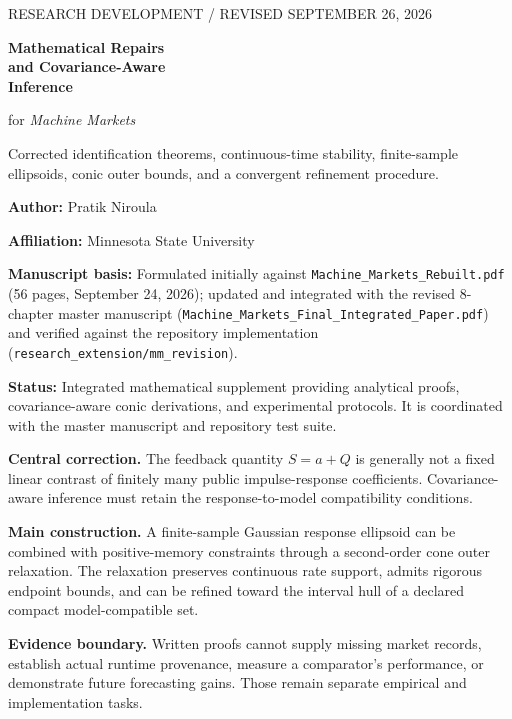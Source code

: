 \documentclass[11pt,a4paper]{article}
\theoremstyle{definition}\newtheorem{definition}[theorem]{Definition}
\theoremstyle{remark}\newtheorem{remark}[theorem]{Remark}
\begin{document}
\begin{titlepage}
\vspace*{18mm}
{\large\textcolor{ink}{RESEARCH DEVELOPMENT / REVISED SEPTEMBER 26, 2026}}\par
\vspace{8mm}
{\Huge\bfseries Mathematical Repairs\\[2mm]and Covariance-Aware\\[2mm]Inference}\par
\vspace{5mm}
{\LARGE for \emph{Machine Markets}}\par
\vspace{8mm}
{\large Corrected identification theorems, continuous-time stability, finite-sample ellipsoids, conic outer bounds, and a convergent refinement procedure.}\par
\vspace{12mm}
\textbf{Author:} Pratik Niroula\par
\textbf{Affiliation:} Minnesota State University\par
\textbf{Manuscript basis:} Formulated initially against \texttt{Machine\_Markets\_Rebuilt.pdf} (56 pages, September 24, 2026); updated and integrated with the revised 8-chapter master manuscript (\texttt{Machine\_Markets\_Final\_Integrated\_Paper.pdf}) and verified against the repository implementation (\texttt{research\_extension/mm\_revision}).\par

\textbf{Status:} Integrated mathematical supplement providing analytical proofs, covariance-aware conic derivations, and experimental protocols. It is coordinated with the master manuscript and repository test suite.\par
\vspace{8mm}
\textbf{Central correction.} The feedback quantity $S=a+Q$ is generally not a fixed linear contrast of finitely many public impulse-response coefficients. Covariance-aware inference must retain the response-to-model compatibility conditions.\par
\vspace{5mm}
\textbf{Main construction.} A finite-sample Gaussian response ellipsoid can be combined with positive-memory constraints through a second-order cone outer relaxation. The relaxation preserves continuous rate support, admits rigorous endpoint bounds, and can be refined toward the interval hull of a declared compact model-compatible set.\par
\vfill
\textbf{Evidence boundary.} Written proofs cannot supply missing market records, establish actual runtime provenance, measure a comparator's performance, or demonstrate future forecasting gains. Those remain separate empirical and implementation tasks.
\end{titlepage}
\tableofcontents
\newpage
\end{document}
